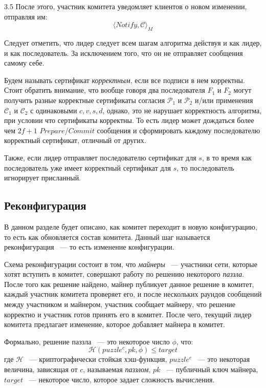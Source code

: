 3.5 После этого, участник комитета уведомляет клиентов о новом изменении, отправляя им:
 \[ \langle Notify, \mathcal{C} \rangle_M \]

Следует отметить, что лидер следует всем шагам алгоритма действуя и как лидер, и как последователь. За исключением того, что он не отправляет сообщения самому себе.

Будем называть сертификат \textit{корректным}, если все подписи в нем корректны.
Стоит обратить внимание, что вообще говоря два последователя $F_1$ и $F_2$ могут получить разные корректные сертификаты согласия $\mathcal{P}_1$ и $\mathcal{P}_2$ и/или применения $\mathcal{C}_1$ и $\mathcal{C}_2$ с одинаковыми $c, v, s, d$, однако, это не нарушает корректность алгоритма, при условии что сертификаты корректны.
То есть лидер может дождаться более чем $2f+1$ $Prepare$/$Commit$ сообщения и сформировать каждому последователю корректный сертификат, отличный от других.

Также, если лидер отправляет последователю сертификат для $s$, в то время как последователь уже имеет корректный сертификат для $s$, то последователь игнорирует присланный.

\subsection{Реконфигурация} \label{reconfig}
В данном разделе будет описано, как комитет переходит в новую конфигурацию, то есть как обновляется состав комитета. Данный шаг называется реконфигурация ~--- то есть изменение конфигурации.

Схема реконфигурации состоит в том, что \textit{майнеры} ~--- участники сети, которые хотят вступить в комитет, совершают работу по решению некоторого \textit{паззла}. После того как решение найдено, майнер публикует данное решение в комитет, каждый участник комитета проверяет его, и после нескольких раундов сообщений между участником и майнером, участник сообщает майнеру, что решение корректно и участник готов принять его в комитет.
После чего, текущий лидер комитета предлагает изменение, которое добавляет майнера в комитет.

Формально, решение паззла ~--- это некоторое число $\phi$, что:
$$\mathcal{H}(puzzle^c, pk, \phi) \le target$$
где $\mathcal{H}$ ~--- криптографически стойкая хэш-функция, $puzzle^c$ ~--- это некоторая величина, зависящая от $c$, называемая \textit{паззлом}, $pk$ ~--- публичный ключ майнера, $target$ ~--- некоторое число, которое задает сложность вычисления.

